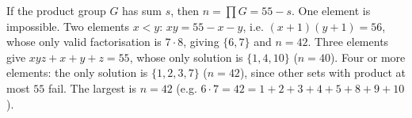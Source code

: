 If the product group $G$ has sum $s$, then $n=\prod G=55-s$. One element is impossible. Two elements $x<y$: $xy=55-x-y$, i.e. $(x+1)(y+1)=56$, whose only valid factorisation is $7\cdot8$, giving $\{6,7\}$ and $n=42$. Three elements give $xyz+x+y+z=55$, whose only solution is $\{1,4,10\}$ ($n=40$). Four or more elements: the only solution is $\{1,2,3,7\}$ ($n=42$), since other sets with product at most $55$ fail. The largest is $n=\boxed{42}$ (e.g. $6\cdot7=42=1+2+3+4+5+8+9+10$).
